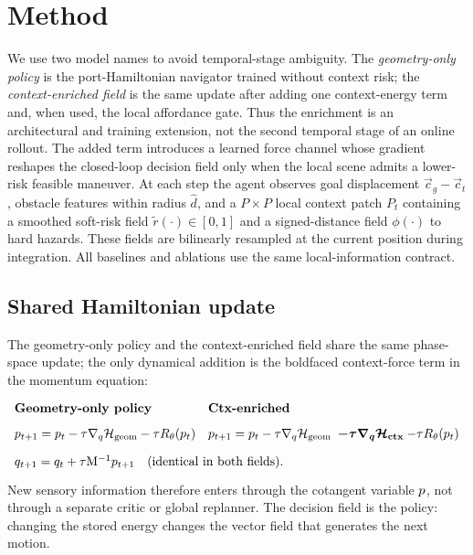 \section{Method}
\label{sec:method}

We use two model names to avoid temporal-stage ambiguity. The
\emph{geometry-only policy} is the port-Hamiltonian navigator trained
without context risk;
the \emph{context-enriched field} is the same update after adding
one context-energy term and, when used, the local affordance gate.
Thus the enrichment is an architectural and training extension, not
the second temporal stage of an online rollout. The added term introduces
a learned force channel whose gradient reshapes the closed-loop decision
field only when the local scene admits a lower-risk feasible maneuver.  At each step the agent observes goal
displacement $\vec c_g-\vec c_t$, obstacle features within radius $\hat d$,
and a $P\times P$ local context patch $P_t$ containing a smoothed soft-risk
field $\tilde r(\cdot)\in[0,1]$ and a signed-distance field $\phi(\cdot)$ to
hard hazards.  These fields are bilinearly resampled at the current position
during integration.  All baselines and ablations use the same local-information
contract.

\subsection{Shared Hamiltonian update}
\label{sec:method:skeleton}

The geometry-only policy and the context-enriched field share the same phase-space update; the only dynamical
addition is the boldfaced context-force term in the momentum equation:
\begin{equation}
\renewcommand{\arraystretch}{1.5}
\begin{array}{ll}
\textbf{Geometry-only policy} & \textbf{Ctx-enriched} \\[2pt]
\Mom_{t+1} = \Mom_t
  - \tau\nabla_\Pos\Ham_{\rm geom}
  - \tau R_\theta(\Mom_t)
&
\Mom_{t+1} = \Mom_t
  - \tau\nabla_\Pos\Ham_{\rm geom}
  \;\boldsymbol{-\tau\nabla_\Pos\Ham_{\rm ctx}}
  - \tau R_\theta(\Mom_t) \\[4pt]
\multicolumn{2}{l}{\Pos_{t+1} = \Pos_t + \tau\Mass^{-1}\Mom_{t+1}
  \quad\text{(identical in both fields).}}
\end{array}
\label{eq:method:skeleton}
\end{equation}
New sensory information therefore enters through the cotangent variable
$p$, not through a separate critic or global replanner.  The decision field
is the policy: changing the stored energy changes the vector field that
generates the next motion.

